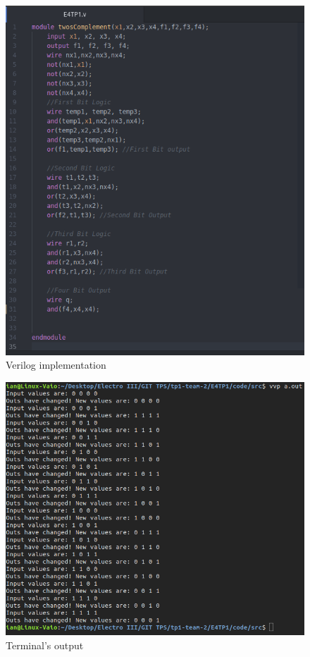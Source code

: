 \begin{figure}[h!] %
\begin{centering}
\includegraphics[scale=0.4]{../E4TP1/images/5}
\par\end{centering}
\caption{\color{cyan}Verilog implementation}
\label{fig:figura4.6}
\end{figure}

\begin{figure}[h!]%
\begin{centering}
\includegraphics[scale=0.4]{../E4TP1/images/6}
\par\end{centering}
\caption{\color{cyan}Terminal's output}
\label{fig:figura4.7}
\end{figure}

%
